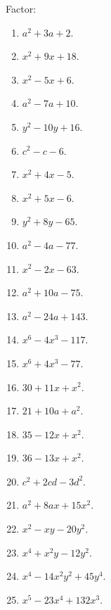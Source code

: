 \documentclass{book}
\begin{document}
Factor:
\begin{enumerate}

\item $a^2+3a+2$.

\item $x^2+9x+18$.

\item $x^2-5x+6$.

\item $a^2-7a+10$.

\item $y^2-10y+16$.

\item $c^2-c-6$.

\item $x^2+4x-5$.

\item $x^2+5x-6$.

\item $y^2+8y-65$.

\item $a^2-4a-77$.

\item $x^2-2x-63$.

\item $a^2+10a-75$.

\item $a^2-24a+143$.

\item $x^6-4x^3-117$.

\item $x^6+4x^3-77$.

\item $30+11x+x^2$.

\item $21+10a+a^2$.

\item $35-12x+x^2$.

\item $36-13x+x^2$.

\item $c^2+2cd-3d^2$.

\item $a^2+8ax+15x^2$.

\item $x^2-xy-20y^2$.

\item $x^4+x^2y-12y^2$.

\item $x^4-14x^2y^2+45y^4$.

\item $x^5-23x^4+132x^3$.


\end{enumerate}
\end{document}
